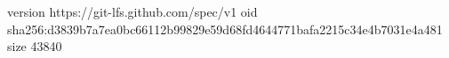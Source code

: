 version https://git-lfs.github.com/spec/v1
oid sha256:d3839b7a7ea0bc66112b99829e59d68fd4644771bafa2215c34e4b7031e4a481
size 43840
